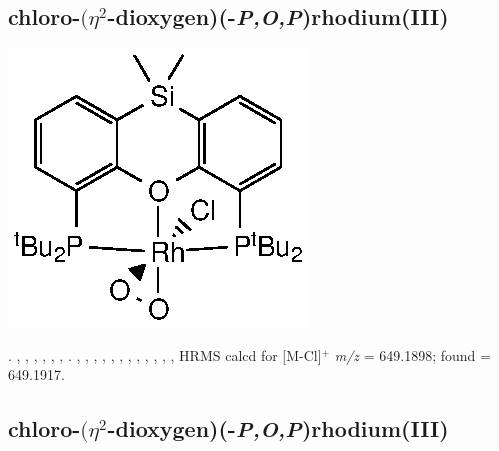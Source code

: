 
\subsection*{chloro-$(\eta^2$-dioxygen)(\tBusixantphosk-\emph{P,O,P})rhodium(III)}

\begin{structure}[h]
\begin{center}
\includegraphics{../Structures/SitBuRhClO2.eps}
\end{center}
\end{structure}



.
,
,
,
,
,
,
.
,
,
,
,
,
,
,
,
,
,
,
,
HRMS calcd for  [M-Cl]$^+$ \emph{m/z} = 649.1898; found = 649.1917.


\subsection*{chloro-$(\eta^2$-dioxygen)(\tButhixantphosk-\emph{P,O,P})rhodium(III)}

